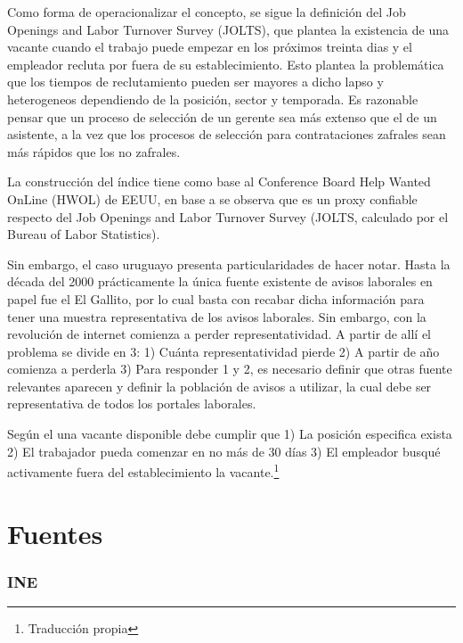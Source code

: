 Como forma de operacionalizar el concepto, se sigue la definición del Job Openings and Labor Turnover Survey (JOLTS), que plantea la existencia de una vacante cuando el trabajo puede empezar en los próximos treinta dias y el empleador recluta por fuera de su establecimiento. Esto plantea la problemática que los tiempos de reclutamiento pueden ser mayores a dicho lapso y heterogeneos dependiendo de la posición, sector y temporada. Es razonable pensar que un proceso de selección de un gerente sea más extenso que el de un asistente, a la vez que los procesos de selección para contrataciones zafrales sean más rápidos que los no zafrales.





La construcción del índice tiene como base al Conference Board Help Wanted OnLine (HWOL) de EEUU, en base a \cite{Barnichon2010, Shimer2005} se observa que es un proxy confiable respecto del Job Openings and Labor Turnover Survey (JOLTS, calculado por el Bureau of Labor Statistics).  

Sin embargo, el caso uruguayo presenta particularidades de hacer notar. Hasta la década del 2000 prácticamente la única fuente existente de avisos laborales en papel fue el El Gallito, por lo cual basta con recabar dicha información para tener una muestra representativa de los avisos laborales. Sin embargo, con la revolución de internet comienza a perder representatividad. A partir de allí el problema se divide en 3: 1) Cuánta representatividad pierde 2) A partir de año comienza a perderla 3) Para responder 1 y 2, es necesario definir que otras fuente relevantes aparecen y definir la población de avisos a utilizar, la cual debe ser representativa de todos los portales laborales.


Según el \cite{JOLTS} una vacante disponible debe cumplir que 1) La posición especifica exista 2) El trabajador pueda comenzar en no más de 30 días 3) El empleador busqué activamente fuera del establecimiento la vacante.\footnote{Traducción propia}



\section{Fuentes}

\subsubsection*{INE}

